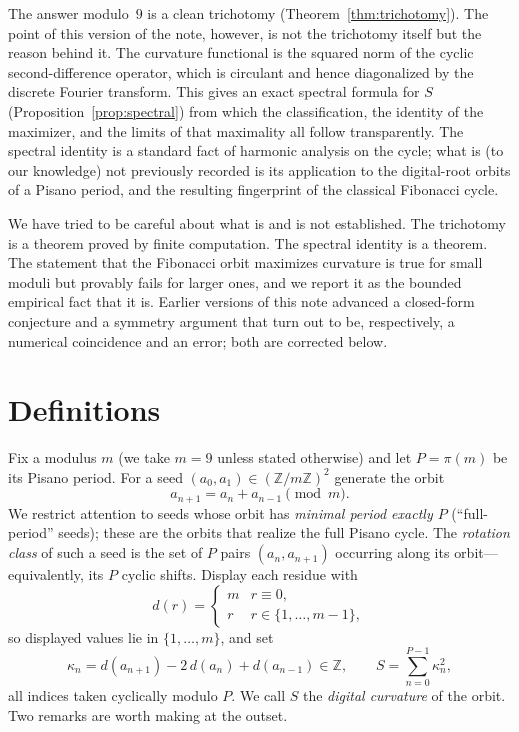 \documentclass[12pt]{article}
\theoremstyle{remark}
\begin{document}
The answer modulo~$9$ is a clean trichotomy (Theorem~\ref{thm:trichotomy}). The point of
this version of the note, however, is not the trichotomy itself but the reason behind it.
The curvature functional is the squared norm of the cyclic second-difference operator,
which is circulant and hence diagonalized by the discrete Fourier transform. This gives an
exact spectral formula for $S$ (Proposition~\ref{prop:spectral}) from which the
classification, the identity of the maximizer, and the limits of that maximality all
follow transparently. The spectral identity is a standard fact of harmonic analysis on the
cycle; what is (to our knowledge) not previously recorded is its application to the
digital-root orbits of a Pisano period, and the resulting fingerprint of the classical
Fibonacci cycle.

We have tried to be careful about what is and is not established. The trichotomy is a
theorem proved by finite computation. The spectral identity is a theorem. The statement
that the Fibonacci orbit maximizes curvature is true for small moduli but provably fails
for larger ones, and we report it as the bounded empirical fact that it is. Earlier
versions of this note advanced a closed-form conjecture and a symmetry argument that turn
out to be, respectively, a numerical coincidence and an error; both are corrected below.

\section{Definitions}\label{sec:defs}

Fix a modulus $m$ (we take $m=9$ unless stated otherwise) and let $P=\pi(m)$ be its
Pisano period. For a seed $(a_0,a_1)\in(\mathbb Z/m\mathbb Z)^2$ generate the orbit
\[
a_{n+1}=a_n+a_{n-1}\pmod m .
\]
We restrict attention to seeds whose orbit has \emph{minimal period exactly $P$}
(``full-period'' seeds); these are the orbits that realize the full Pisano cycle. The
\emph{rotation class} of such a seed is the set of $P$ pairs $(a_n,a_{n+1})$ occurring
along its orbit---equivalently, its $P$ cyclic shifts. Display
each residue with
\[
d(r)=\begin{cases}m & r\equiv 0,\\ r & r\in\{1,\dots,m-1\},\end{cases}
\]
so displayed values lie in $\{1,\dots,m\}$, and set
\[
\kappa_n=d(a_{n+1})-2\,d(a_n)+d(a_{n-1})\in\mathbb Z,
\qquad
S=\sum_{n=0}^{P-1}\kappa_n^{2},
\]
all indices taken cyclically modulo $P$. We call $S$ the \emph{digital curvature} of the
orbit. Two remarks are worth making at the outset.
\end{document}
